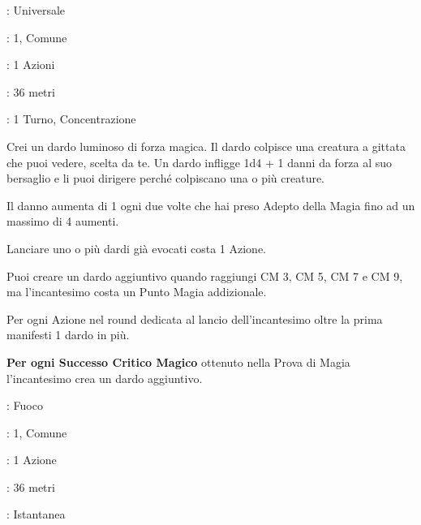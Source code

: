\begin{multicols}{2}
\noindent\colorbox{OBSSgold!10}{
\begin{minipage}{0.95\linewidth}
\begin{description}[noitemsep, topsep=0pt, parsep=0pt, partopsep=0pt, leftmargin=0cm, labelwidth=1.3cm]
	\item[\textbf{Lista}]: Universale
	\item[\textbf{Livello}]: 1, Comune
	\item[\textbf{Lancio}]: 1 Azioni
	\item[\textbf{Gittata}]: 36 metri
	\item[\textbf{Durata}]: 1 Turno, Concentrazione
\end{description}
\end{minipage}}\smallskip

Crei un dardo luminoso di forza magica. Il dardo colpisce una creatura a gittata che puoi vedere, scelta da te. Un dardo infligge 1d4 + 1 danni da forza al suo bersaglio e li puoi dirigere perché colpiscano una o più creature.

Il danno aumenta di 1 ogni due volte che hai preso Adepto della Magia fino ad un massimo di 4 aumenti.

Lanciare uno o più dardi già evocati costa 1 Azione.

Puoi creare un dardo aggiuntivo quando raggiungi CM 3, CM 5, CM 7 e CM 9, ma l'incantesimo costa un Punto Magia addizionale.

Per ogni Azione nel round dedicata al lancio dell'incantesimo oltre la prima manifesti 1 dardo in più.

\textbf{Per ogni Successo Critico Magico} ottenuto nella Prova di Magia l'incantesimo crea un dardo aggiuntivo.

\noindent\colorbox{OBSSgold!10}{
\begin{minipage}{0.95\linewidth}
\begin{description}[noitemsep, topsep=0pt, parsep=0pt, partopsep=0pt, leftmargin=0cm, labelwidth=1.3cm]
	\item[\textbf{Lista}]: Fuoco
	\item[\textbf{Livello}]: 1, Comune
	\item[\textbf{Lancio}]: 1 Azione
	\item[\textbf{Gittata}]: 36 metri
	\item[\textbf{Durata}]: Istantanea
\end{description}
\end{minipage}}\smallskip


\end{multicols}
